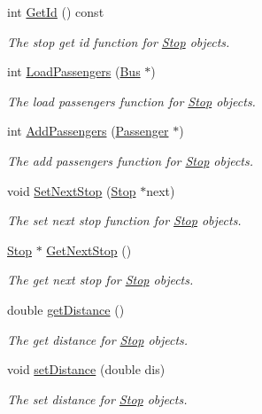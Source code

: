 \begin{DoxyCompactItemize}
int \hyperlink{classStop_a2f3b845d5a338f197226c90696314904}{Get\+Id} () const
\begin{DoxyCompactList}\small\item\em The stop get id function for \hyperlink{classStop}{Stop} objects. \end{DoxyCompactList}\item 
int \hyperlink{classStop_a02c6dcba2b6de5fdd008cf623f19bf7c}{Load\+Passengers} (\hyperlink{classBus}{Bus} $\ast$)
\begin{DoxyCompactList}\small\item\em The load passengers function for \hyperlink{classStop}{Stop} objects. \end{DoxyCompactList}\item 
int \hyperlink{classStop_a20a8b6035679d92a7a838a03a102bcd1}{Add\+Passengers} (\hyperlink{classPassenger}{Passenger} $\ast$)
\begin{DoxyCompactList}\small\item\em The add passengers function for \hyperlink{classStop}{Stop} objects. \end{DoxyCompactList}\item 
void \hyperlink{classStop_a7e39a7138f5bcf8f144155de7b1ae1aa}{Set\+Next\+Stop} (\hyperlink{classStop}{Stop} $\ast$next)
\begin{DoxyCompactList}\small\item\em The set next stop function for \hyperlink{classStop}{Stop} objects. \end{DoxyCompactList}\item 
\hyperlink{classStop}{Stop} $\ast$ \hyperlink{classStop_a195566d0fb9cc1bcc8929cffd5602052}{Get\+Next\+Stop} ()
\begin{DoxyCompactList}\small\item\em The get next stop for \hyperlink{classStop}{Stop} objects. \end{DoxyCompactList}\item 
double \hyperlink{classStop_a75185ff04f33083582c98230fc3a6df4}{get\+Distance} ()
\begin{DoxyCompactList}\small\item\em The get distance for \hyperlink{classStop}{Stop} objects. \end{DoxyCompactList}\item 
void \hyperlink{classStop_af26acbcbca66d3a36ce01bc662e2e892}{set\+Distance} (double dis)
\begin{DoxyCompactList}\small\item\em The set distance for \hyperlink{classStop}{Stop} objects. \end{DoxyCompactList}\item 

\end{DoxyCompactItemize}

